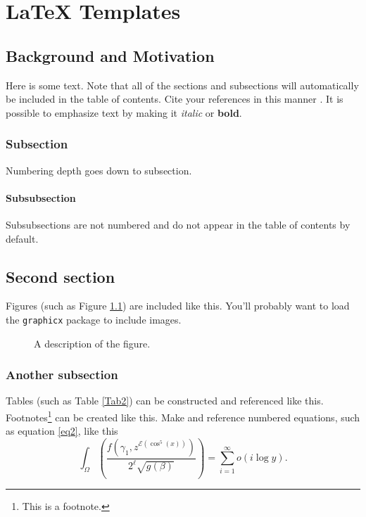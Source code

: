 \chapter{LaTeX Templates}

\section{Background and Motivation}

Here is some text. Note that all of the sections and subsections will automatically be included in the table of contents. Cite your references in this manner \cite{anybody}. It is possible to emphasize text by making it \emph{italic} or \textbf{bold}.

\subsection{Subsection}

Numbering depth goes down to subsection. 

\subsubsection{Subsubsection}
Subsubsections are not numbered and do not appear in the table of contents by default. 


\section{Second section}

Figures (such as Figure \ref{Fig2}) are included like this. You'll probably want to load the \verb!graphicx! package to include images.

\begin{figure}[h]
 \caption{A description of the figure.}
 \label{Fig2}
\end{figure}


\subsection{Another subsection}

Tables (such as Table \ref{Tab2}) can be constructed and referenced like this. Footnotes\footnote{This is a footnote.} can be created like this. Make and reference numbered equations, such as equation \eqref{eq2}, like this
\begin{equation}
 \label{eq2}
 \int_{\Omega} \left(\frac{f(\gamma_1,z^{\mathcal{E}(\cos^5(x))})}{2^\ell\sqrt{g(\beta)}}\right)=\sum_{i=1}^\infty o(i\log y).
\end{equation}

